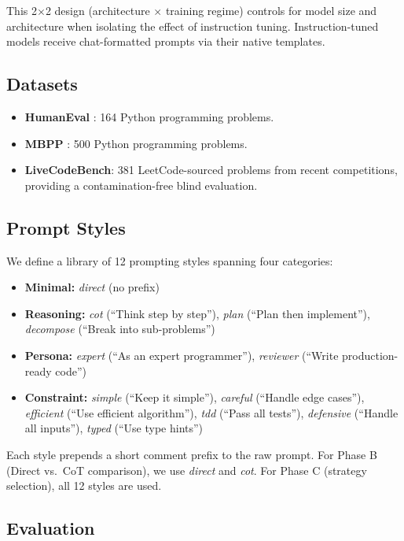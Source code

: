 \documentclass{article}
\begin{document}
This 2$\times$2 design (architecture $\times$ training regime) controls for model size and architecture when isolating the effect of instruction tuning. Instruction-tuned models receive chat-formatted prompts via their native templates.

\subsection{Datasets}

\begin{itemize}
    \item \textbf{HumanEval} \citep{chen2021evaluating}: 164 Python programming problems.
    \item \textbf{MBPP} \citep{austin2021mbpp}: 500 Python programming problems.
    \item \textbf{LiveCodeBench}: 381 LeetCode-sourced problems from recent competitions, providing a contamination-free blind evaluation.
\end{itemize}

\subsection{Prompt Styles}

We define a library of 12 prompting styles spanning four categories:

\begin{itemize}
    \item \textbf{Minimal:} \emph{direct} (no prefix)
    \item \textbf{Reasoning:} \emph{cot} (``Think step by step''), \emph{plan} (``Plan then implement''), \emph{decompose} (``Break into sub-problems'')
    \item \textbf{Persona:} \emph{expert} (``As an expert programmer''), \emph{reviewer} (``Write production-ready code'')
    \item \textbf{Constraint:} \emph{simple} (``Keep it simple''), \emph{careful} (``Handle edge cases''), \emph{efficient} (``Use efficient algorithm''), \emph{tdd} (``Pass all tests''), \emph{defensive} (``Handle all inputs''), \emph{typed} (``Use type hints'')
\end{itemize}

Each style prepends a short comment prefix to the raw prompt. For Phase B (Direct vs.\ CoT comparison), we use \emph{direct} and \emph{cot}. For Phase C (strategy selection), all 12 styles are used.

\subsection{Evaluation}
\end{document}

